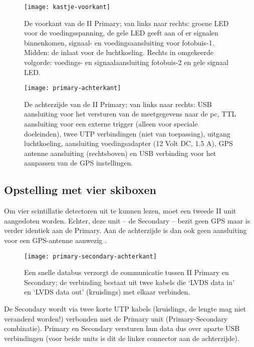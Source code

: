 \begin{figure}
    \centering
    \texttt{[image: kastje-voorkant]}
    \caption{De voorkant van de \hisparc II Primary; van links naar
    rechts: groene LED voor de voedingsspanning, de gele LED geeft aan
    of er signalen binnenkomen, signaal- en voedingsaansluiting voor
    fotobuis-1. Midden: de inlaat voor de luchtkoeling. Rechts in
    omgekeerde volgorde: voedings- en signaalaansluiting fotobuis-2 en
    gele signaal LED.}
    \label{fig:kastje-voorkant}
\end{figure}

\begin{figure}
    \centering
    \texttt{[image: primary-achterkant]}
    \caption{De achterzijde van de \hisparc II Primary; van links naar
    rechts: USB aansluiting voor het versturen van de meetgegevens naar
    de pc, TTL aansluiting voor een externe trigger (alleen voor
    speciale doeleinden), twee UTP verbindingen (niet van toepassing),
    uitgang luchtkoeling, aansluiting voedingsadapter (12 Volt DC, 1.5
    A), GPS antenne aansluiting (rechtsboven) en USB verbinding voor het
    aanpassen van de GPS instellingen.}
    \label{fig:primary-achterkant}
\end{figure}

\subsection{Opstelling met vier skiboxen}

Om vier scintillatie detectoren uit te kunnen lezen, moet een tweede
\hisparc II unit aangesloten worden. Echter, deze unit – de Secondary –
 bezit geen GPS maar is verder identiek aan de
Primary. Aan de achterzijde is dan ook geen aansluiting voor een
GPS-antenne aanwezig .

\begin{figure}
    \centering
    \texttt{[image: primary-secondary-achterkant]}
    \caption{Een snelle databus verzorgt de communicatie tussen \hisparc
    II Primary en Secondary; de verbinding bestaat uit twee kabels die ‘LVDS
    data in’ en ‘LVDS data out’ (kruislings) met elkaar verbinden.}
    \label{fig:primary-secondary-achterkant}
\end{figure}

De Secondary wordt via twee korte UTP kabels (kruislings, de lengte mag niet
veranderd worden!) verbonden met de Primary unit (Primary-Secondary
combinatie). Primary en Secondary versturen hun data dus over aparte USB
verbindingen (voor beide units is dit de linker connector aan de
achterzijde).


